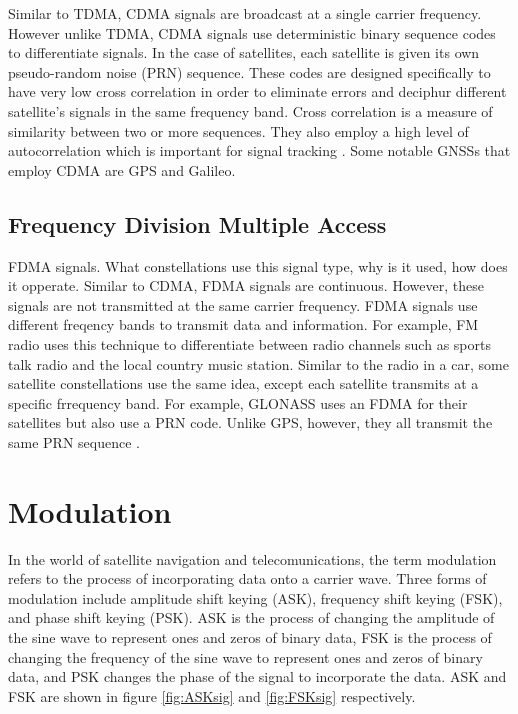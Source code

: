 \documentclass[12pt]{report}
\begin{document}
Similar to TDMA, CDMA signals are broadcast at a single carrier frequency. However unlike TDMA, CDMA signals use deterministic binary sequence codes to differentiate signals. In the case of satellites, each satellite is given its own pseudo-random noise (PRN) sequence. These codes are designed specifically to have very low cross correlation in order to eliminate errors and deciphur different satellite's signals in the same frequency band. Cross correlation is a measure of similarity between two or more sequences. They also employ a high level of autocorrelation which is important for signal tracking \cite{goldOptimalBinarySequences1967}. Some notable GNSSs that employ CDMA are GPS and Galileo.

\subsection{Frequency Division Multiple Access}

FDMA signals. What constellations use this signal type, why is it used, how does it opperate. 
Similar to CDMA, FDMA signals are continuous. However, these signals are not transmitted at the same carrier frequency. FDMA signals use different freqency bands to transmit data and information. For example, FM radio uses this technique to differentiate between radio channels such as sports talk radio and the local country music station. Similar to the radio in a car, some satellite constellations use the same idea, except each satellite transmits at a specific frrequency band. For example, GLONASS uses an FDMA for their satellites but also use a PRN code. Unlike GPS, however, they all transmit the same PRN sequence \cite{GLONASSSignalPlan}. 

\section{Modulation}
In the world of satellite navigation and telecomunications, the term modulation refers to the process of incorporating data onto a carrier wave. Three forms of modulation include amplitude shift keying (ASK), frequency shift keying (FSK), and phase shift keying (PSK). ASK is the process of changing the amplitude of the sine wave to represent ones and zeros of binary data, FSK is the process of changing the frequency of the sine wave to represent ones and zeros of binary data, and PSK changes the phase of the signal to incorporate the data. ASK and FSK are shown in figure \ref{fig:ASKsig} and \ref{fig:FSKsig} respectively.
\end{document}
